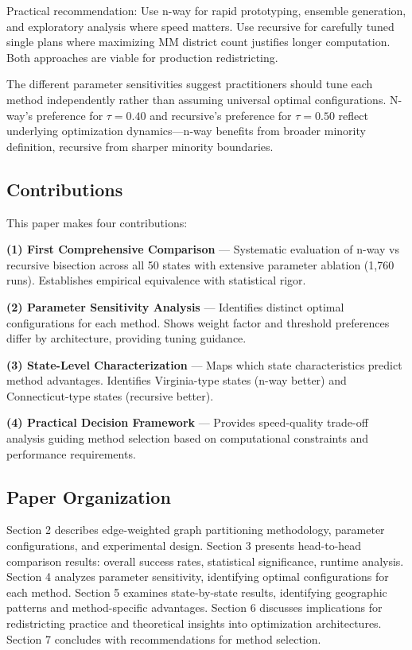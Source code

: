 Practical recommendation: Use n-way for rapid prototyping, ensemble generation, and exploratory analysis where speed matters. Use recursive for carefully tuned single plans where maximizing MM district count justifies longer computation. Both approaches are viable for production redistricting.

The different parameter sensitivities suggest practitioners should tune each method independently rather than assuming universal optimal configurations. N-way's preference for $\tau=0.40$ and recursive's preference for $\tau=0.50$ reflect underlying optimization dynamics—n-way benefits from broader minority definition, recursive from sharper minority boundaries.

\subsection{Contributions}

This paper makes four contributions:

\textbf{(1) First Comprehensive Comparison} — Systematic evaluation of n-way vs recursive bisection across all 50 states with extensive parameter ablation (1,760 runs). Establishes empirical equivalence with statistical rigor.

\textbf{(2) Parameter Sensitivity Analysis} — Identifies distinct optimal configurations for each method. Shows weight factor and threshold preferences differ by architecture, providing tuning guidance.

\textbf{(3) State-Level Characterization} — Maps which state characteristics predict method advantages. Identifies Virginia-type states (n-way better) and Connecticut-type states (recursive better).

\textbf{(4) Practical Decision Framework} — Provides speed-quality trade-off analysis guiding method selection based on computational constraints and performance requirements.

\subsection{Paper Organization}

Section 2 describes edge-weighted graph partitioning methodology, parameter configurations, and experimental design. Section 3 presents head-to-head comparison results: overall success rates, statistical significance, runtime analysis. Section 4 analyzes parameter sensitivity, identifying optimal configurations for each method. Section 5 examines state-by-state results, identifying geographic patterns and method-specific advantages. Section 6 discusses implications for redistricting practice and theoretical insights into optimization architectures. Section 7 concludes with recommendations for method selection.
